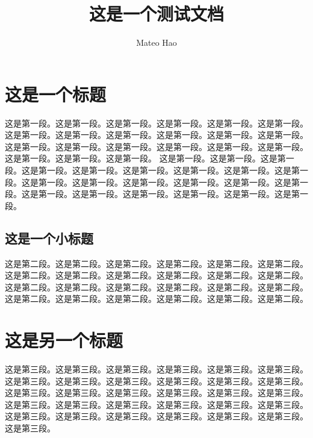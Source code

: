 \documentclass{article}
\title{这是一个测试文档}
\author{Mateo Hao}
\begin{document}
\maketitle{}
  \section{这是一个标题}


这是第一段。这是第一段。这是第一段。这是第一段。这是第一段。这是第一段。这是第一段。这是第一段。这是第一段。这是第一段。这是第一段。这是第一段。这是第一段。这是第一段。这是第一段。这是第一段。这是第一段。这是第一段。这是第一段。这是第一段。这是第一段。 这是第一段。这是第一段。这是第一段。这是第一段。这是第一段。这是第一段。这是第一段。这是第一段。这是第一段。这是第一段。这是第一段。这是第一段。这是第一段。这是第一段。这是第一段。这是第一段。这是第一段。这是第一段。这是第一段。这是第一段。这是第一段。

\subsection{这是一个小标题}


这是第二段。这是第二段。这是第二段。这是第二段。这是第二段。这是第二段。这是第二段。这是第二段。这是第二段。这是第二段。这是第二段。这是第二段。这是第二段。这是第二段。这是第二段。这是第二段。这是第二段。这是第二段。这是第二段。这是第二段。这是第二段。这是第二段。这是第二段。这是第二段。

\section{这是另一个标题}


这是第三段。这是第三段。这是第三段。这是第三段。这是第三段。这是第三段。这是第三段。这是第三段。这是第三段。这是第三段。这是第三段。这是第三段。这是第三段。这是第三段。这是第三段。这是第三段。这是第三段。这是第三段。这是第三段。这是第三段。这是第三段。这是第三段。这是第三段。这是第三段。这是第三段。这是第三段。这是第三段。这是第三段。这是第三段。这是第三段。这是第三段。
\end{document}
